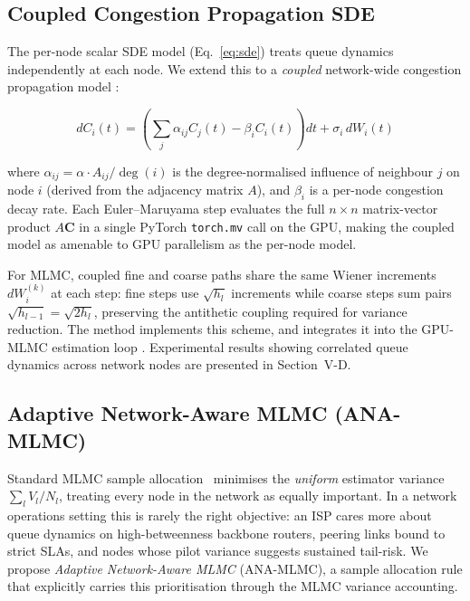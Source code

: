 \documentclass[pdflatex,sn-mathphys-num]{sn-jnl}
\theoremstyle{thmstyleone}%
\theoremstyle{thmstyletwo}%
\theoremstyle{thmstylethree}%
\begin{document}
\subsection{Coupled Congestion Propagation SDE}
\label{subsec:spatial}

The per-node scalar SDE model (Eq.~\eqref{eq:sde}) treats queue dynamics independently at each
node. We extend this to a \emph{coupled} network-wide congestion propagation model
\cite{kang2007,harrison1985,mandelbaum2014stochastic}:

\begin{equation}
    dC_i(t) = \left(\sum_j \alpha_{ij} C_j(t) - \beta_i C_i(t)\right)dt
              + \sigma_i\, dW_i(t)
    \label{eq:coupled_sde}
\end{equation}

\noindent where $\alpha_{ij} = \alpha \cdot A_{ij} / \deg(i)$ is the degree-normalised influence
of neighbour $j$ on node $i$ (derived from the adjacency matrix $A$), and $\beta_i$ is a per-node
congestion decay rate. Each Euler--Maruyama step evaluates the full $n \times n$ matrix-vector
product $A\mathbf{C}$ in a single PyTorch \texttt{torch.mv} call on the GPU, making the coupled
model as amenable to GPU parallelism as the per-node model.

For MLMC, coupled fine and coarse paths share the same Wiener increments $dW_i^{(k)}$ at each
step: fine steps use $\sqrt{h_l}$ increments while coarse steps sum pairs
$\sqrt{h_{l-1}} = \sqrt{2h_l}$, preserving the antithetic coupling required for variance
reduction. The  method implements this
scheme, and  integrates it into the GPU-MLMC estimation loop
. Experimental results showing correlated queue dynamics across
network nodes are presented in Section~V-D.

\subsection{Adaptive Network-Aware MLMC (ANA-MLMC)}
\label{subsec:ana_mlmc}

Standard MLMC sample allocation~\cite{giles2015multilevel} minimises the \emph{uniform}
estimator variance $\sum_l V_l/N_l$, treating every node in the network as equally important.
In a network operations setting this is rarely the right objective: an ISP cares more about queue
dynamics on high-betweenness backbone routers, peering links bound to strict SLAs, and nodes
whose pilot variance suggests sustained tail-risk. We propose \emph{Adaptive Network-Aware MLMC}
(ANA-MLMC), a sample allocation rule that explicitly carries this prioritisation through the MLMC
variance accounting.
\end{document}
